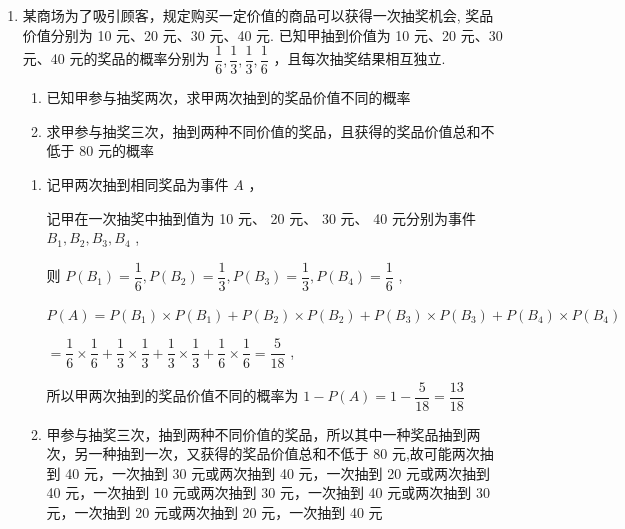 \begin{enumerate}
\begin{enumerate}
\begin{jieda}
\begin{enumerate}
                可得 $P\left( F\right)  = P\left( {D \cup  E}\right)  = P\left( D\right)  + P\left( E\right)  = \dfrac{1}{216} + \dfrac{1}{12} = \dfrac{19}{216}$ ,
                
                所以该局打 5 个球结束的概率为 $\dfrac{19}{216}$
            \end{enumerate}
        \end{jieda}
        
        \item 某商场为了吸引顾客，规定购买一定价值的商品可以获得一次抽奖机会, 奖品价值分别为 10 元、20 元、30 元、40 元. 已知甲抽到价值为 10 元、20 元、30 元、40 元的奖品的概率分别为 $\dfrac{1}{6},\dfrac{1}{3},\dfrac{1}{3},\dfrac{1}{6}$ ，且每次抽奖结果相互独立.
        \begin{enumerate}
            \item 已知甲参与抽奖两次，求甲两次抽到的奖品价值不同的概率
            \item 求甲参与抽奖三次，抽到两种不同价值的奖品，且获得的奖品价值总和不低于 80 元的概率
        \end{enumerate}
        \begin{jieda}
            \begin{enumerate}
                \item 记甲两次抽到相同奖品为事件 $A$ ，
                
                记甲在一次抽奖中抽到值为 10 元、 20 元、 30 元、 40 元分别为事件 ${B}_{1},{B}_{2},{B}_{3},{B}_{4}$ ,
                
                则 $P\left( {B}_{1}\right)  = \dfrac{1}{6},P\left( {B}_{2}\right)  = \dfrac{1}{3},P\left( {B}_{3}\right)  = \dfrac{1}{3},P\left( {B}_{4}\right)  = \dfrac{1}{6}$ ,
                
                $P\left( A\right)  = P\left( {B}_{1}\right)  \times  P\left( {B}_{1}\right)  + P\left( {B}_{2}\right)  \times  P\left( {B}_{2}\right)  + P\left( {B}_{3}\right)  \times  P\left( {B}_{3}\right)  + P\left( {B}_{4}\right)  \times  P\left( {B}_{4}\right)$
                
                $= \dfrac{1}{6} \times  \dfrac{1}{6} + \dfrac{1}{3} \times  \dfrac{1}{3} + \dfrac{1}{3} \times  \dfrac{1}{3} + \dfrac{1}{6} \times  \dfrac{1}{6} = \dfrac{5}{18}$ ,
                
                所以甲两次抽到的奖品价值不同的概率为 $1 - P\left( A\right)  = 1 - \dfrac{5}{18} = \dfrac{13}{18}$

                \item 甲参与抽奖三次，抽到两种不同价值的奖品，所以其中一种奖品抽到两次，另一种抽到一次，又获得的奖品价值总和不低于 80 元,故可能两次抽到 40 元，一次抽到 30 元或两次抽到 40 元，一次抽到 20 元或两次抽到 40 元，一次抽到 10 元或两次抽到 30 元，一次抽到 40 元或两次抽到 30 元，一次抽到 20 元或两次抽到 20 元，一次抽到 40 元
                

\end{enumerate}
\end{jieda}
\end{enumerate}
\end{enumerate}
